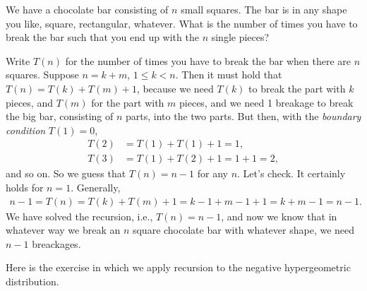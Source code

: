 \begin{exercise}
We have a chocolate bar consisting of $n$ small squares.
The bar is in any shape you like, square, rectangular, whatever.
What is the number of times you have to break the bar such that you end up with the $n$ single pieces?
\begin{solution}
  Write $T(n)$ for the number of times you have to break the bar when there are $n$ squares.
 Suppose $n=k+m$, $1 \leq k < n$. Then it must hold that $T(n) = T(k) + T(m) + 1$, because we need $T(k)$ to break the part with $k$ pieces, and $T(m)$ for the part with $m$ pieces, and we need 1 breakage to break the big bar, consisting of $n$ parts, into the two parts. But then, with the \emph{boundary condition} $T(1)=0$,
  \begin{align*}
    T(2) &= T(1) + T(1) + 1 = 1, \\
T(3) &= T(1) + T(2) + 1 = 1 + 1 = 2,
  \end{align*}
and so on. So we guess that $T(n)=n-1$ for any $n$. Let's check. It certainly holds for $n=1$.  Generally,
\begin{align*}
n-1 = T(n) = T(k) + T(m) + 1 = k-1 + m-1 + 1 = k+m-1 = n-1.
\end{align*}
We have solved the recursion, i.e., $T(n)=n-1$, and now we know that in whatever way we break an $n$ square chocolate bar with whatever shape, we need $n-1$ breackages.

\end{solution}
\end{exercise}


Here is the exercise in which we apply recursion to the negative hypergeometric distribution.

